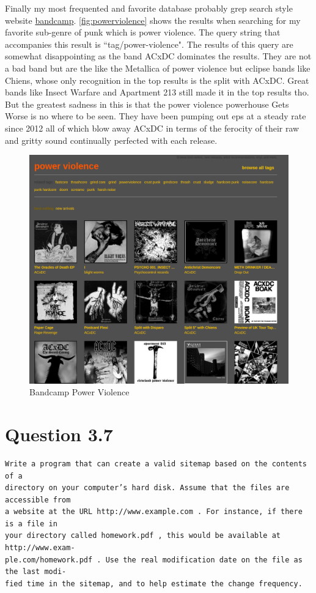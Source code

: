 \documentclass[11pt]{article}
\begin{document}
\newpage
\noindent
Finally my most frequented and favorite database probably grep search style website \hyperref[https://bandcamp.com/]{bandcamp}. \autoref{fig:powerviolence} shows the results when searching for my favorite sub-genre of punk which is power violence. The query string that accompanies this result is ``tag/power-violence".  The results of this query are somewhat disappointing as the band ACxDC dominates the results. They are not a bad band but are the like the Metallica of power violence but eclipse bands like Chiens, whose only recognition in the top results is the split with ACxDC. Great bands like Insect Warfare and Apartment 213 still made it in the top results tho. But the greatest sadness in this is that the power violence powerhouse Gets Worse is no where to be seen. They have been pumping out eps at a steady rate since 2012 all of which blow away ACxDC in terms of the ferocity of their raw and gritty sound continually perfected with each release. 

\begin{figure}[h]
	\centering
	\includegraphics[scale=0.5]{searchStyleBC.png}
	\caption{Bandcamp Power Violence} \label{fig:powerviolence}
\end{figure}






\newpage
\clearpage
\section{Question 3.7} \label{sec:q2}
\begin{verbatim}
Write a program that can create a valid sitemap based on the contents of a
directory on your computer’s hard disk. Assume that the files are accessible from
a website at the URL http://www.example.com . For instance, if there is a file in
your directory called homework.pdf , this would be available at http://www.exam-
ple.com/homework.pdf . Use the real modification date on the file as the last modi-
fied time in the sitemap, and to help estimate the change frequency.
\end{verbatim}
\end{document}
